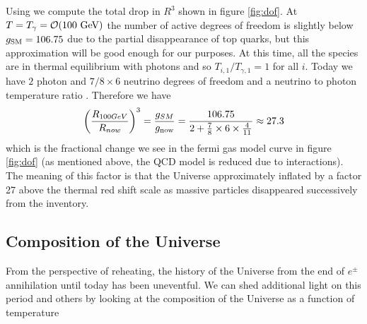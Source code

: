 Using   we  compute the total drop in $R^3$ shown in figure \ref{fig:dof}.  At $T=T_\gamma=\mathcal{O}(100\text{ GeV})$ the number of active degrees of freedom is slightly below $g_{\rm SM}=106.75$ due to the partial disappearance of top quarks, but this approximation will be good enough for our purposes.  At this time, all the species are in thermal equilibrium with photons and so $T_{i,1}/T_{\gamma,1}=1$ for all $i$.  Today we have $2$ photon and $7/8\times 6$ neutrino degrees of freedom and a  neutrino to photon temperature ratio .  Therefore we have
\begin{equation}
\left(\frac{R_{100GeV}}{R_{now}}\right)^3= \frac{g_{SM}}{g_{\rm now}}=\frac{106.75}{2+\frac{7}{8}\times 6\times \frac{4}{11}}\approx 27.3
\end{equation}
which is the  fractional change we see in the fermi gas model curve in figure \ref{fig:dof} (as mentioned above, the QCD model is reduced due to interactions). The meaning of this factor is that the Universe approximately inflated by a factor 27 above the thermal red shift scale as massive particles disappeared successively from the inventory. 


\subsection{Composition of the Universe}
From the perspective of reheating, the history of the Universe from the end of $e^\pm$ annihilation until today has been uneventful.  We can shed additional light on this period and others by looking at the composition of the Universe as a function of temperature

